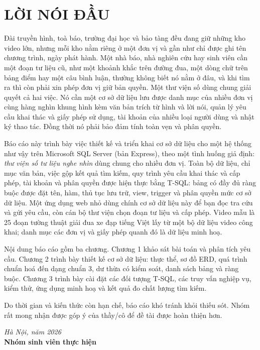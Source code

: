 \clearpage\chapter*{LỜI NÓI ĐẦU}

Đài truyền hình, toà báo, trường đại học và bảo tàng đều đang giữ những kho video lớn,
nhưng mỗi kho nằm riêng ở một đơn vị và gần như chỉ được ghi tên chương trình, ngày phát hành.
Một nhà báo, nhà nghiên cứu hay sinh viên cần một đoạn tư liệu cũ, như một khoảnh khắc trên
đường đua, một dòng chữ trên bảng điểm hay một câu bình luận, thường không biết nó nằm ở đâu,
và khi tìm ra thì còn phải xin phép đơn vị giữ bản quyền. Một thư viện số dùng chung giải
quyết cả hai việc. Nó cần một cơ sở dữ liệu lưu được danh mục của nhiều đơn vị cùng hàng
nghìn khung hình kèm văn bản trích từ hình và lời nói, quản lý yêu cầu khai thác và giấy phép
sử dụng, tài khoản của nhiều loại người dùng và nhật ký thao tác. Đồng thời nó phải bảo đảm
tính toàn vẹn và phân quyền.

Báo cáo này trình bày việc thiết kế và triển khai cơ sở dữ liệu cho một hệ thống như vậy trên
Microsoft SQL Server (bản Express), theo một tình huống giả định: \textit{thư viện số tư
liệu nghe nhìn} dùng chung cho nhiều đơn vị. Toàn bộ dữ liệu, chỉ mục văn bản, việc gộp kết
quả tìm kiếm, quy trình yêu cầu khai thác và cấp phép, tài khoản và phân quyền được hiện thực
bằng T-SQL: bảng có đầy đủ ràng buộc được đặt tên, hàm, thủ tục lưu trữ, view, trigger và phân
quyền mức cơ sở dữ liệu. Một ứng dụng web nhỏ dùng chính cơ sở dữ liệu này để bạn đọc tra cứu
và gửi yêu cầu, còn cán bộ thư viện chọn đoạn tư liệu và cấp phép. Video mẫu là 25 đoạn tường
thuật giải đua xe đạp tiếng Việt lấy từ một bộ dữ liệu video công khai; danh mục các đơn vị
và giấy phép quanh đó là dữ liệu minh hoạ.

Nội dung báo cáo gồm ba chương. Chương 1 khảo sát bài toán và phân tích yêu cầu. Chương 2
trình bày thiết kế cơ sở dữ liệu: thực thể, sơ đồ ERD, quá trình chuẩn hoá đến dạng chuẩn 3,
dư thừa có kiểm soát, danh sách bảng và ràng buộc. Chương 3 trình bày cài đặt các đối tượng T-SQL, các truy vấn
nghiệp vụ, kiểm thử, ứng dụng minh hoạ và kết quả đo chất lượng tìm kiếm.

Do thời gian và kiến thức còn hạn chế, báo cáo khó tránh khỏi thiếu sót. Nhóm rất mong
nhận được góp ý của thầy/cô để đề tài được hoàn thiện hơn.
\\
\vfill

\begin{flushright}
\textit{Hà Nội, năm 2026}\\
\textbf{Nhóm sinh viên thực hiện}
\end{flushright}
